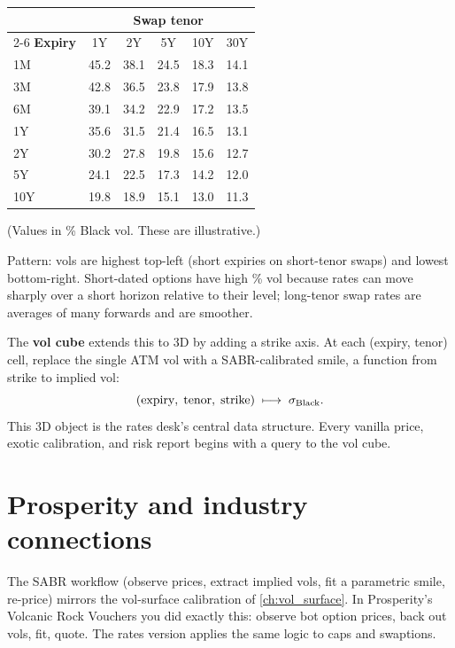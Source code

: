 \begin{center}
\begin{tabular}{l ccccc}
  \toprule
  & \multicolumn{5}{c}{\textbf{Swap tenor}} \\
  \cmidrule(lr){2-6}
  \textbf{Expiry} & 1Y & 2Y & 5Y & 10Y & 30Y \\
  \midrule
  1M  & 45.2 & 38.1 & 24.5 & 18.3 & 14.1 \\
  3M  & 42.8 & 36.5 & 23.8 & 17.9 & 13.8 \\
  6M  & 39.1 & 34.2 & 22.9 & 17.2 & 13.5 \\
  1Y  & 35.6 & 31.5 & 21.4 & 16.5 & 13.1 \\
  2Y  & 30.2 & 27.8 & 19.8 & 15.6 & 12.7 \\
  5Y  & 24.1 & 22.5 & 17.3 & 14.2 & 12.0 \\
  10Y & 19.8 & 18.9 & 15.1 & 13.0 & 11.3 \\
  \bottomrule
\end{tabular}
\end{center}

\noindent (Values in \% Black vol.  These are illustrative.)

Pattern: vols are highest top-left (short expiries on short-tenor
swaps) and lowest bottom-right.  Short-dated options have high
\% vol because rates can move sharply over a short horizon relative to
their level; long-tenor swap rates are averages of many forwards and
are smoother.

The \textbf{vol cube} extends this to 3D by adding a strike axis.  At
each (expiry, tenor) cell, replace the single ATM vol with a
SABR-calibrated smile, a function from strike to implied vol:
\[
  (\text{expiry}, \;\text{tenor}, \;\text{strike}) \;\longmapsto\; \sigma_{\text{Black}}.
\]
This 3D object is the rates desk's central data structure.  Every
vanilla price, exotic calibration, and risk report begins with a
query to the vol cube.


\section{Prosperity and industry connections}
\label{sec:rates_deriv_connections}

\begin{prosperitybox}
The SABR workflow (observe prices, extract implied vols, fit a
parametric smile, re-price) mirrors the vol-surface calibration of
\cref{ch:vol_surface}.  In Prosperity's Volcanic Rock Vouchers you
did exactly this: observe bot option prices, back out vols, fit,
quote.  The rates version applies the same logic to caps and
swaptions.
\end{prosperitybox}

